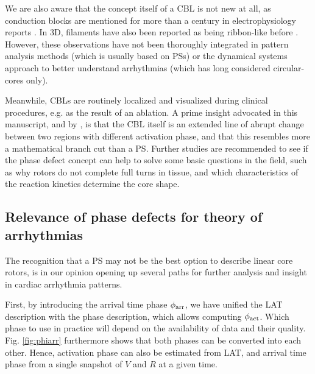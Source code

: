 \documentclass{article}
\newcommand{\phiact}{\ensuremath{\phi_{\rm act}}}
\newcommand{\phiarr}{\ensuremath{\phi_{\rm arr}}}
\begin{document}
We are also aware that the concept itself of a CBL is not new at all, as conduction blocks are mentioned for more than a century in electrophysiology reports \citep{Mines:1913}. In 3D, filaments have also been reported as being ribbon-like before \citep{Efimov:1999}. However, these observations have not been thoroughly integrated in pattern analysis methods (which is usually based on PSs) or the dynamical systems approach to better understand arrhythmias (which has long considered circular-cores only). 

Meanwhile, CBLs are routinely localized and visualized during clinical procedures, e.g. as the result of an ablation. A prime insight advocated in this manuscript, and by \cite{Tomii:2021}, is that the CBL itself is an extended line of abrupt change between two regions with different activation phase, and that this resembles more a mathematical branch cut than a PS. Further studies are recommended to see if the phase defect concept can help to solve some basic questions in the field, such as why rotors do not complete full turns in tissue, and which characteristics of the reaction kinetics determine the core shape. 

\subsection{Relevance of phase defects for theory of arrhythmias}

The recognition that a PS may not be the best option to describe linear core rotors, is in our opinion opening up several paths for further analysis and insight in cardiac arrhythmia patterns. 

First, by introducing the arrival time phase $\phiarr$, we have unified the LAT description with the phase description, which allows computing $\phiact$. Which phase to use in practice will depend on the availability of data and their quality. Fig. \ref{fig:phiarr} furthermore shows that both phases can be converted into each other. Hence, activation phase can also be estimated from LAT, and arrival time phase from a single snapshot of $V$ and $R$ at a given time.  
\end{document}
